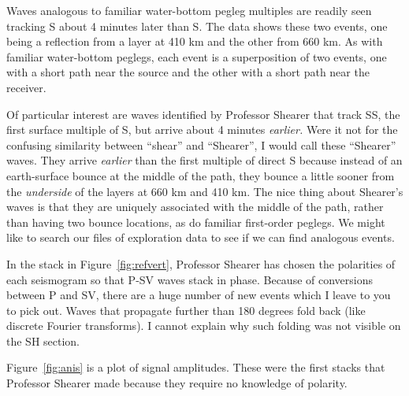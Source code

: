 
\par
Waves analogous to familiar water-bottom pegleg multiples
are readily seen tracking S about 4 minutes later than S.
The data shows these two events,
one being a reflection from a layer at 410 km
and the other from 660 km.
As with familiar water-bottom peglegs,
each event is a superposition of two events,
one with a short path near the source
and the other with a short path near the receiver.

\par
Of particular interest are waves identified by Professor Shearer
that track SS, the first surface multiple of S,
but arrive about 4 minutes {\it earlier.}
Were it not for the confusing similarity between ``shear'' and ``Shearer'',
I would call these ``Shearer'' waves.
They arrive {\it earlier} than the first multiple of direct S because
instead of an earth-surface bounce at the middle of the path,
they bounce a little sooner
from the {\it underside} of the layers at 660 km and 410 km.
The nice thing about Shearer's waves is that they are uniquely
associated with the middle of the path,
rather than having two bounce locations, as do familiar first-order peglegs.
We might like to search our files of exploration data
to see if we can find analogous events.

\par
In the stack in Figure~\ref{fig:refvert}, Professor Shearer
has chosen the polarities of each seismogram
so that P-SV waves stack in phase.
Because of conversions between P and SV,
there are a huge number of new events which I leave to you to pick out.
Waves that propagate further than 180 degrees fold back
(like discrete Fourier transforms).
I cannot explain why such folding was not visible on the SH section.




Figure~\ref{fig:anis} is a plot of signal amplitudes.
These were the first stacks that Professor Shearer made
because they require no knowledge of polarity.


